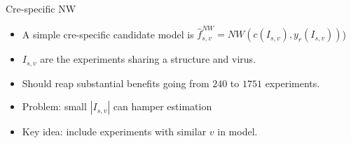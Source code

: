 \documentclass{beamer}
\begin{document}
\begin{frame}{Cre-specific NW}
\begin{itemize}
    \item A simple cre-specific candidate model is $\hat f_{s, v}^{NW} = NW (c(I_{s, v}),  y_r(I_{s, v}))$)
    \item $I_{s, v}$ are the experiments sharing a structure and virus.
    \item Should reap substantial benefits going from $240$ to $1751$ experiments.
    \item Problem: small $|I_{s, v}|$ can hamper estimation
    \item Key idea: include experiments with similar $v$ in model.
\end{itemize}
\end{frame}
\end{document}
